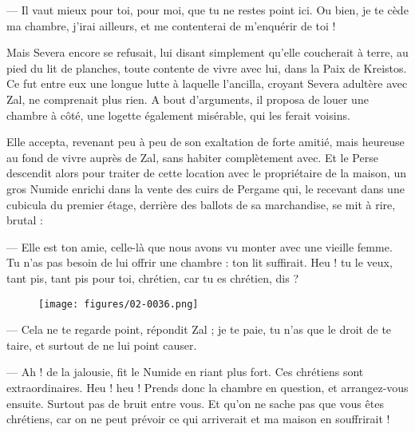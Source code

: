 \documentclass[a4paper, 11pt, oneside, polutonikogreek, french]{article}
\begin{document}
--- Il vaut mieux pour toi, pour moi, que tu ne restes point ici. Ou bien, je te cède ma chambre, j'irai ailleurs, et me contenterai de m'enquérir de toi !

Mais Severa encore se refusait, lui disant simplement qu'elle coucherait à terre, au pied du lit de planches, toute contente de vivre avec lui, dans la Paix de Kreistos. Ce fut entre eux une longue lutte à laquelle l'ancilla, croyant Severa adultère avec Zal, ne comprenait plus rien. A bout d'arguments, il proposa de louer une chambre à côté, une logette également misérable, qui les ferait voisins.

Elle accepta, revenant peu à peu de son exaltation de forte amitié, mais heureuse au fond de vivre auprès de Zal, sans habiter complètement avec. Et le Perse descendit alors pour traiter de cette location avec le propriétaire de la maison, un gros Numide enrichi dans la vente des cuirs de Pergame qui, le recevant dans une cubicula du premier étage, derrière des ballots de sa marchandise, se mit à rire, brutal :

--- Elle est ton amie, celle-là que nous avons vu monter avec une vieille femme. Tu n'as pas besoin de lui offrir une chambre : ton lit suffirait. Heu ! tu le veux, tant pis, tant pis pour toi, chrétien, car tu es chrétien, dis ?
\begin{figure}[H]
\centering
\texttt{[image: figures/02-0036.png]}
\end{figure}
--- Cela ne te regarde point, répondit Zal ; je te paie, tu n'as que le droit de te taire, et surtout de ne lui point causer.

--- Ah ! de la jalousie, fit le Numide en riant plus fort. Ces chrétiens sont extraordinaires. Heu ! heu ! Prends donc la chambre en question, et arrangez-vous ensuite. Surtout pas de bruit entre vous. Et qu'on ne sache pas que vous êtes chrétiens, car on ne peut prévoir ce qui arriverait et ma maison en souffrirait !
\clearpage
\subsection{}
\end{document}

